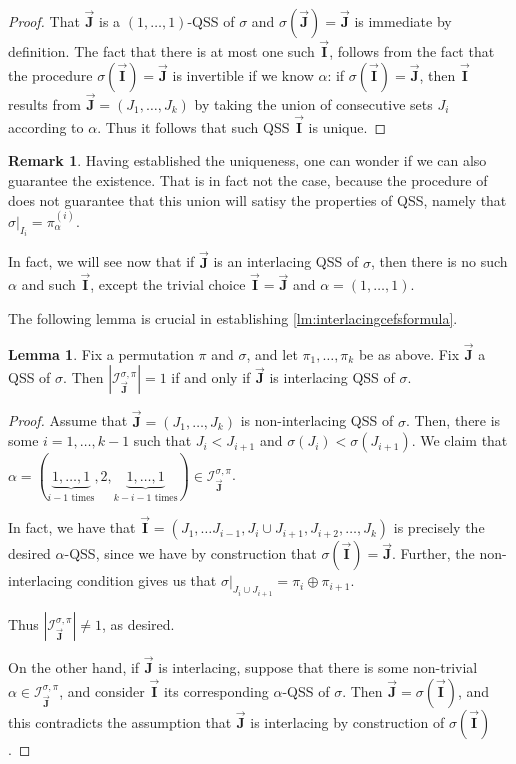 \documentclass[12pt, reqno]{amsart}
\theoremstyle{definition}
\newtheorem{lm}[thm]{Lemma}
\newtheorem{rem}[thm]{Remark}
\newcommand{\III}{\vec{\mathbf{I}}}
\newcommand{\JJJ}{\vec{\mathbf{J}}}
\begin{document}
\begin{proof}
That $\JJJ $ is a $(1, \dots , 1)$-QSS of $\sigma$ and $\sigma(\JJJ ) = \JJJ$ is immediate by definition.
The fact that there is at most one such $\III $, follows from the fact that the procedure $\sigma ( \III ) = \JJJ $ is invertible if we know $\alpha $: if $\sigma ( \III ) = \JJJ $, then $\III $ results from $\JJJ =(J_1, \dots , J_k)$ by taking the union of consecutive sets $J_i$ according to $\alpha $.
Thus it follows that such QSS $\III $ is unique.
\end{proof}

\begin{rem}
Having established the uniqueness, one can wonder if we can also guarantee the existence.
That is in fact not the case, because the procedure of  does not guarantee that this union will satisy the properties of QSS, namely that $\sigma|_{I_i}= \pi^{(i)}_{\alpha }$.

In fact, we will see now that if $\JJJ $ is an interlacing QSS of $\sigma $, then there is no such $\alpha $ and such $\III$, except the trivial choice $\III= \JJJ$ and $\alpha = (1, \dots , 1)$.
\end{rem}

The following lemma is crucial in establishing \cref{lm:interlacingcefsformula}.

\begin{lm}\label{lm:noninterlacingcrit}
Fix a permutation $\pi$ and $\sigma $, and let $\pi_1, \dots ,\pi_k$ be as above.
Fix $\JJJ$ a QSS of $\sigma $.
Then $|\mathcal I^{\sigma, \pi }_{\JJJ} | = 1 $ if and only if $\JJJ $ is interlacing QSS of $\sigma$.
\end{lm}

\begin{proof}
Assume that $\JJJ = (J_1, \dots , J_k ) $ is non-interlacing QSS of $\sigma$.
Then, there is some $i= 1, \dots , k-1 $ such that $J_i< J_{i+1}$ and $\sigma(J_i) < \sigma (J_{i+1})$.
We claim that $\alpha = (\underbrace{1, \dots ,1 }_{i-1 \text{ times}}, 2, \underbrace{1, \dots ,1 }_{k-i-1 \text{ times}}) \in \mathcal I^{\sigma, \pi }_{\JJJ}$.


In fact, we have that $\III = (J_1, \dots J_{i-1}, J_i\cup J_{i+1}, J_{i+2}, \dots , J_k ) $ is precisely the desired $\alpha$-QSS, since we have by construction that $\sigma (\III ) = \JJJ$.
Further, the non-interlacing condition gives us that $\sigma|_{ J_i\cup J_{i+1}} = \pi_i\oplus\pi_{i+1}$.

Thus $|\mathcal I^{\sigma, \pi }_{\JJJ} | \neq 1 $, as desired.


On the other hand, if $\JJJ $ is interlacing, suppose that there is some non-trivial $\alpha \in \mathcal I^{\sigma, \pi }_{\JJJ}$, and consider $\III $ its corresponding $\alpha$-QSS of $\sigma$.
Then $\JJJ = \sigma (\III )$, and this contradicts the assumption that $\JJJ $ is interlacing by construction of $\sigma (\III)$.
\end{proof}
\end{document}

